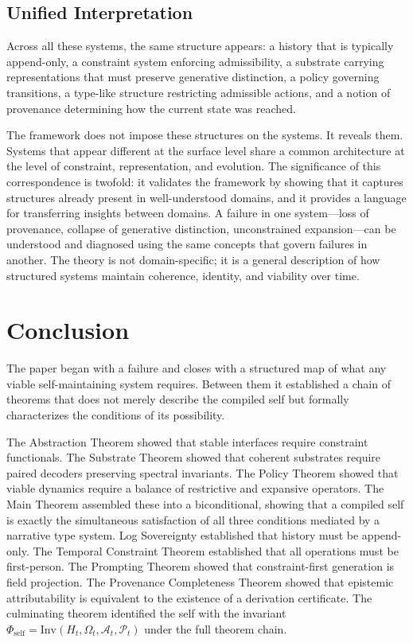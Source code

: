 \documentclass[12pt, a4paper]{article}
\theoremstyle{plain}
\theoremstyle{definition}
\theoremstyle{remark}
\begin{document}
\subsection{Unified Interpretation}

Across all these systems, the same structure appears: a history that is typically append-only, a constraint system enforcing admissibility, a substrate carrying representations that must preserve generative distinction, a policy governing transitions, a type-like structure restricting admissible actions, and a notion of provenance determining how the current state was reached.

The framework does not impose these structures on the systems. It reveals them. Systems that appear different at the surface level share a common architecture at the level of constraint, representation, and evolution. The significance of this correspondence is twofold: it validates the framework by showing that it captures structures already present in well-understood domains, and it provides a language for transferring insights between domains. A failure in one system---loss of provenance, collapse of generative distinction, unconstrained expansion---can be understood and diagnosed using the same concepts that govern failures in another. The theory is not domain-specific; it is a general description of how structured systems maintain coherence, identity, and viability over time.

\section*{Conclusion}

The paper began with a failure and closes with a structured map of what any viable self-maintaining system requires. Between them it established a chain of theorems that does not merely describe the compiled self but formally characterizes the conditions of its possibility.

The Abstraction Theorem showed that stable interfaces require constraint functionals. The Substrate Theorem showed that coherent substrates require paired decoders preserving spectral invariants. The Policy Theorem showed that viable dynamics require a balance of restrictive and expansive operators. The Main Theorem assembled these into a biconditional, showing that a compiled self is exactly the simultaneous satisfaction of all three conditions mediated by a narrative type system. Log Sovereignty established that history must be append-only. The Temporal Constraint Theorem established that all operations must be first-person. The Prompting Theorem showed that constraint-first generation is field projection. The Provenance Completeness Theorem showed that epistemic attributability is equivalent to the existence of a derivation certificate. The culminating theorem identified the self with the invariant $\Phi_{\mathrm{self}} = \mathrm{Inv}(H_t, \Omega_t, \mathcal{A}_t, \mathcal{P}_t)$ under the full theorem chain.
\end{document}
